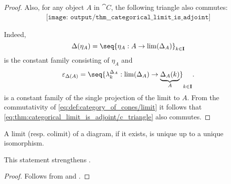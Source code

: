 \begin{proof}
  Also, for any object \( A \) in \( \cat{C} \), the following triangle also commutes:
  \begin{equation}\label{eq:thm:categorical_limit_is_adjoint/c_triangle}
    \begin{aligned}
      \texttt{[image: output/thm\_\_categorical\_limit\_is\_adjoint]}
    \end{aligned}
  \end{equation}

  Indeed,
  \begin{equation*}
    \Delta(\eta_A) = \seq{ \eta_A: A \to \lim(\Delta_A) }_{k \in \cat{I}}
  \end{equation*}
  is the constant family consisting of \( \eta_A \) and
  \begin{equation*}
    \varepsilon_{\Delta(A)} = \seq{ \lambda_k^{\Delta_A}: \lim(\Delta_A) \to \underbrace{\Delta_A(k)}_{A} }_{k \in \cat{I}}.
  \end{equation*}
  is a constant family of the single projection of the limit to \( A \). From the commutativity of \eqref{eq:def:category_of_cones/limit} it follows that \eqref{eq:thm:categorical_limit_is_adjoint/c_triangle} also commutes.
\end{proof}

\begin{corollary}\label{thm:categorical_limit_uniqueness}
  A limit (resp. colimit) of a diagram, if it exists, is unique up to a unique isomorphism.

  This statement strengthens .
\end{corollary}
\begin{proof}
  Follows from  and .
\end{proof}

